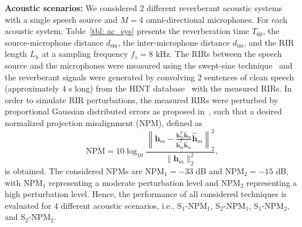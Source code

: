 \documentclass[fleqn]{aes2e}
\begin{document}
\textbf{Acoustic scenarios:} \enspace We considered $2$ different reverberant acoustic systems with a single speech source and $M = 4$ omni-directional microphones. 
For each acoustic system, Table~\ref{tbl: ac_sys} presents the reverberation time $T_{60}$, the source-microphone distance $d_{\text{sm}}$, the inter-microphone distance $d_{\text{im}}$, and the RIR length $L_h$ at a sampling frequency $f_s = 8$ kHz. 
The RIRs between the speech source and the microphones were measured using the swept-sine technique~\cite{Farina_2000} and the reverberant signals were generated by convolving $2$ sentences of clean speech (approximately $4$ s long) from the HINT database~\cite{Nilsson_JASA_1994} with the measured RIRs.
In order to simulate RIR perturbations, the measured RIRs were perturbed by proportional Gaussian distributed errors as proposed in~\cite{Zhang_HINDAWI_2008}, such that a desired normalized projection misalignment (NPM), defined as
\begin{equation}
{\text{NPM}} = 10 \log_{10} \frac{\left\| \mathbf{h}_m - \frac{\mathbf{h}_m^T\hat{\mathbf{h}}_m}{\hat{\mathbf{h}}_m^T\hat{\mathbf{h}}_m}\hat{\mathbf{h}}_m\right\|_2^2}{\| \mathbf{h}_m \|_2^2},
\end{equation}
is obtained. 
The considered NPMs are NPM$_1 = -33$ dB and NPM$_2 = -15$ dB, with NPM$_1$ representing a moderate perturbation level and NPM$_2$ representing a high perturbation level.
Hence, the performance of all considered techniques is evaluated for $4$ different acoustic scenarios, i.e., S$_1$-NPM$_1$, S$_2$-NPM$_1$, S$_1$-NPM$_2$, and S$_2$-NPM$_2$.
\end{document}
